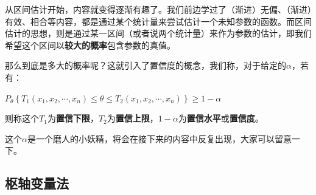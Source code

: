 \documentclass[10pt, a4paper]{article}
\begin{document}
从区间估计开始，内容就变得逐渐有趣了。我们前边学过了（渐进）无偏、（渐进）有效、相合等内容，都是通过某个统计量来尝试估计一个未知参数的函数。而区间估计的思想，则是通过某一区间（或者说两个统计量）来作为参数的估计，即我们希望这个区间以\textbf{较大的概率}包含参数的真值。\par
那么到底是多大的概率呢？这就引入了置信度的概念，我们称，对于给定的$\alpha$，若有：
\begin{center}
    $P_{\theta}\left\{T_{1}\left(x_{1}, x_{2}, \cdots, x_{n}\right) \leqslant \theta \leqslant T_{2}\left(x_{1}, x_{2}, \cdots, x_{n}\right)\right\} \geqslant 1-\alpha$
\end{center} \par
则称这个$T_1$为\textbf{置信下限}，$T_2$为\textbf{置信上限}，$1-\alpha$为\textbf{置信水平}或\textbf{置信度}。\par
这个$\alpha$是一个磨人的小妖精，将会在接下来的内容中反复出现，大家可以留意一下。

\subsection{枢轴变量法}
\end{document}
